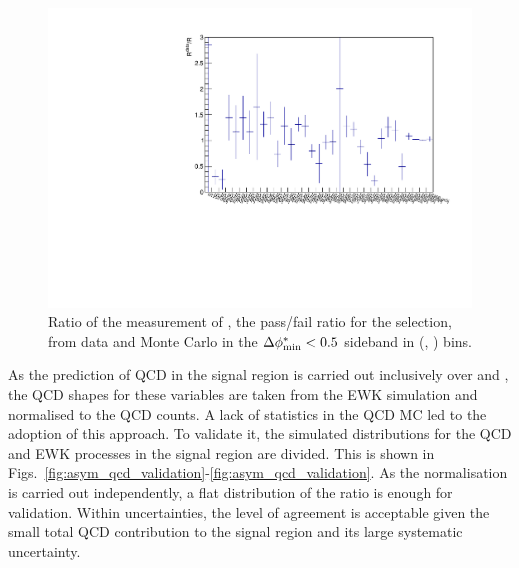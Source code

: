 \begin{figure}[h!]
  \begin{center}        
    \includegraphics[width=\textwidth]{figures/qcd/plots/doubleQcdSbSrRatio1D}
    \caption{ Ratio of the measurement of \rmhtmet, the pass/fail ratio for the \mhtmet selection, from data and Monte Carlo in the $\mbox{$\Delta\phi^{*}_{\rm min}$} < 0.5$ sideband in (\scalht, \njet) bins.  
    }

    \label{fig:RR_qcd}
  \end{center} 
\end{figure}

As the prediction of QCD in the signal region is carried out
inclusively over \nb and \mht, the QCD shapes for these variables are
taken from the EWK simulation and normalised to the QCD counts. 
A lack of statistics in
the QCD MC led to the adoption of this approach. To validate it, the simulated \mht distributions
for the QCD and EWK processes in the signal region are divided. This is shown in
Figs.~\ref{fig:asym_qcd_validation}-\ref{fig:asym_qcd_validation}.
As the normalisation is carried out independently, a flat distribution
of the ratio is enough for validation. Within uncertainties, the level of agreement is acceptable given the
small total QCD contribution to the signal region and its large
systematic uncertainty. 


